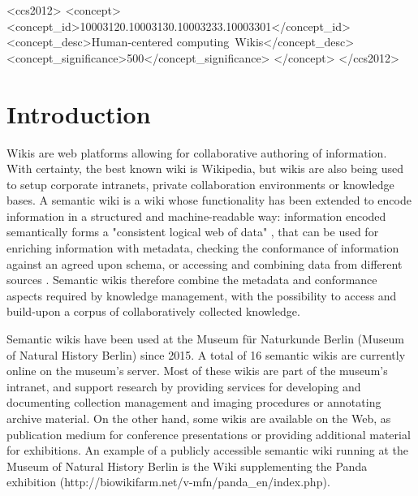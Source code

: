 \documentclass[manuscript,screen,review]{acmart}
\begin{document}
\begin{CCSXML}
<ccs2012>
<concept>
<concept_id>10003120.10003130.10003233.10003301</concept_id>
<concept_desc>Human-centered computing~Wikis</concept_desc>
<concept_significance>500</concept_significance>
</concept>
</ccs2012>
\end{CCSXML}




\maketitle

\section{Introduction}
Wikis are web platforms allowing for collaborative authoring of information. With certainty, the best known wiki is Wikipedia, but wikis are also being used to setup corporate intranets, private collaboration environments or knowledge bases. A semantic wiki is a wiki whose functionality has been extended to encode information in a structured and machine-readable way: information encoded semantically forms a "consistent logical web of data" \cite{berners1998}, that can be used for enriching information with metadata, checking the conformance of information against an agreed upon schema, or accessing and combining data from different sources \cite{oren2006}. Semantic wikis therefore combine the metadata and conformance aspects required by knowledge management, with the possibility to access and build-upon a corpus of collaboratively collected knowledge. 

Semantic wikis have been used at the Museum f\"ur Naturkunde Berlin (Museum of Natural History Berlin) since 2015. A total of 16 semantic wikis are currently online on the museum's server. Most of these wikis are part of the museum's intranet, and support research by providing services for developing and documenting collection management and imaging procedures or annotating archive material. On the other hand, some wikis are available on the Web, as publication medium for conference presentations or providing additional material for exhibitions. An example of a publicly accessible semantic wiki running at the Museum of Natural History Berlin is the Wiki supplementing the Panda exhibition (http://biowikifarm.net/v-mfn/panda\_en/index.php).
\end{document}
